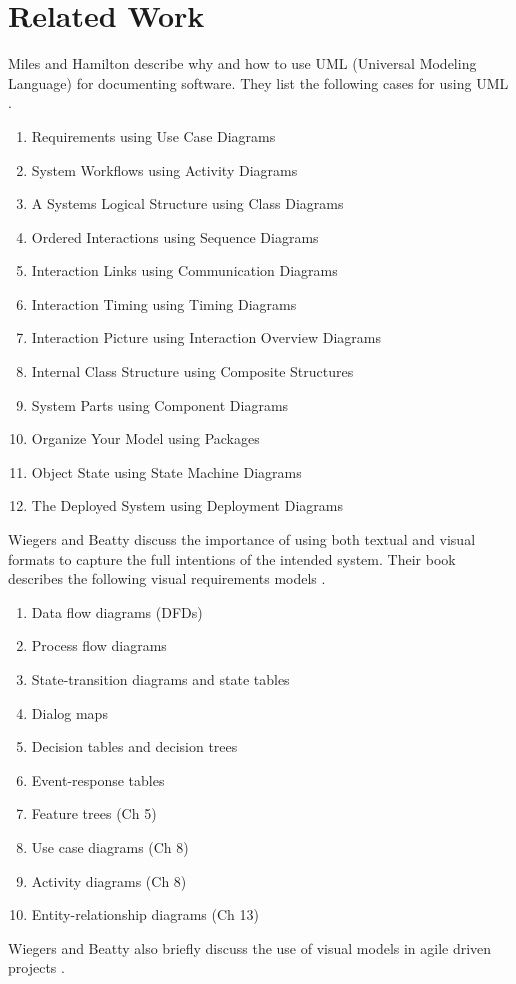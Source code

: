 \documentclass{acm_proc_article-sp}
\begin{document}
\section{Related Work}
Miles and Hamilton describe why and how to use UML (Universal Modeling Language) for documenting software. They list the following cases for using UML \cite{Lamport:UML}.
\begin{enumerate}
	\item Requirements using Use Case Diagrams
	\item System Workflows using Activity Diagrams
	\item A Systems Logical Structure using Class Diagrams
	\item Ordered Interactions using Sequence Diagrams
	\item Interaction Links using Communication Diagrams
	\item Interaction Timing using Timing Diagrams
	\item Interaction Picture using Interaction Overview Diagrams
	\item Internal Class Structure using Composite Structures
	\item System Parts using Component Diagrams
	\item Organize Your Model using Packages
	\item Object State using State Machine Diagrams
	\item The Deployed System using Deployment Diagrams
\end{enumerate}
Wiegers and Beatty discuss the importance of using both textual and visual formats to capture the full intentions of the intended system. Their book describes the following visual requirements models \cite{Lamport:SoftwareRequirements}.
\begin{enumerate}
	\item Data flow diagrams (DFDs)
	\item Process flow diagrams 
	\item State-transition diagrams and state tables
	\item Dialog maps
	\item Decision tables and decision trees
	\item Event-response tables
	\item Feature trees (Ch 5)
	\item Use case diagrams (Ch 8)
	\item Activity diagrams (Ch 8)
	\item Entity-relationship diagrams (Ch 13)
\end{enumerate}
Wiegers and Beatty also briefly discuss the use of visual models in agile driven projects \cite{Lamport:SoftwareRequirements}.
\end{document}
